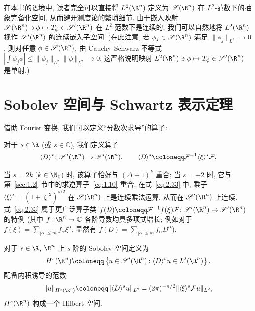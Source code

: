 在本书的语境中, 读者完全可以直接将 $L^2(\R^n)$ 定义为 $\Schwartz(\R^n)$ 在 $L^2$-范数下的抽象完备化空间, 从而避开测度论的繁琐细节. 由于嵌入映射 $\Schwartz(\R^n) \ni \phi \mapsto T_\phi \in \TempDistr(\R^n)$ 在 $L^2$-范数下是连续的, 我们可以自然地将 $L^2(\R^n)$ 视作 $\TempDistr(\R^n)$ 的连续嵌入子空间. (在此注意, 若 $\phi_j \in \Schwartz(\R^n)$ 满足 $\|\phi_j\|_{L^2} \to 0$, 则对任意 $\phi \in \Schwartz(\R^n)$, 由 Cauchy--Schwarz 不等式 $|\int \phi_j \phi| \le \|\phi_j\|_{L^2} \|\phi\|_{L^2} \to 0$; 这严格说明映射 $L^2(\R^n) \ni \phi \mapsto T_\phi \in \TempDistr(\R^n)$ 是单射.)

\section{Sobolev 空间与 Schwartz 表示定理}\label{sec:2.3}
%
%
%

借助 Fourier 变换, 我们可以定义``分数次求导''的算子:

\begin{definition}[$\R^n$ 上的分数阶微分算子]\label{def:2.13}
对于 $s \in \R$ (或 $s \in \mathbb{C}$), 我们定义算子
\begin{equation}\label{eq:2.33}
    \langle D \rangle^s \colon \TempDistr(\R^n) \to \TempDistr(\R^n), \qquad \langle D \rangle^s \defeq \mathcal{F}^{-1} \langle \xi \rangle^s \mathcal{F}.
\end{equation}
\end{definition}

当 $s = 2k$ ($k \in \N_0$) 时, 该算子恰好与 $(\Delta + 1)^k$ 重合; 当 $s = -2$ 时, 它与第~\ref{sec:1.2}~节中的求逆算子~\eqref{eq:1.10} 重合. 在式~\eqref{eq:2.33} 中, 乘子 $\langle \xi \rangle^s = (1 + |\xi|^2)^{s/2}$ 在 $\Schwartz(\R^n)$ 上是连续乘法运算, 从而在 $\TempDistr(\R^n)$ 上连续. 式~\eqref{eq:2.33} 属于更广泛算子类 $f(D) \defeq \mathcal{F}^{-1} f(\xi) \mathcal{F} \colon \TempDistr(\R^n) \to \TempDistr(\R^n)$ 的特例 (其中 $f \colon \R^n \to \mathbb{C}$ 各阶导数均具多项式增长; 例如对于 $f(\xi) = \sum_{|\alpha| \le m} f_\alpha \xi^\alpha$, 显然有 $f(D) = \sum_{|\alpha| \le m} f_\alpha D^\alpha$).

\begin{definition}[$\R^n$ 上的 Sobolev 空间]\label{def:2.14}
对于 $s \in \R$, $\R^n$ 上 $s$ 阶的 Sobolev 空间定义为
\begin{equation}\label{eq:2.34}
    H^s(\R^n) \defeq \left\{ u \in \TempDistr(\R^n) : \langle D \rangle^s u \in L^2(\R^n) \right\}.
\end{equation}
配备内积诱导的范数
\begin{equation}\label{eq:2.35}
    \|u\|_{H^s(\R^n)} \defeq \|\langle D \rangle^s u\|_{L^2} = (2\pi)^{-n/2} \|\langle \xi \rangle^s \mathcal{F} u\|_{L^2},
\end{equation}
$H^s(\R^n)$ 构成一个 Hilbert 空间.
\end{definition}

